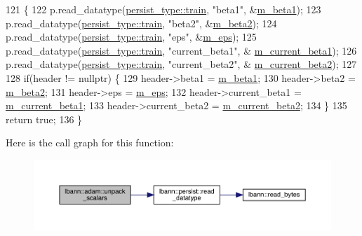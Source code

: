 \begin{DoxyCode}
121                                                                  \{
122     p.read\_datatype(\hyperlink{namespacelbann_adee41f31f15f3906cbdcce4a1417eb56a61b3a8faa9c1091806675c230a9abe64}{persist\_type::train}, \textcolor{stringliteral}{"beta1"}, &\hyperlink{classlbann_1_1adam_a73af15a28066edbfad9ba6a900746a19}{m\_beta1});
123     p.read\_datatype(\hyperlink{namespacelbann_adee41f31f15f3906cbdcce4a1417eb56a61b3a8faa9c1091806675c230a9abe64}{persist\_type::train}, \textcolor{stringliteral}{"beta2"}, &\hyperlink{classlbann_1_1adam_ab1f2a16b8eb7e265895ea9eef3fe87b2}{m\_beta2});
124     p.read\_datatype(\hyperlink{namespacelbann_adee41f31f15f3906cbdcce4a1417eb56a61b3a8faa9c1091806675c230a9abe64}{persist\_type::train}, \textcolor{stringliteral}{"eps"},   &\hyperlink{classlbann_1_1adam_a751102f0fd866612f5685050a08020a9}{m\_eps});
125     p.read\_datatype(\hyperlink{namespacelbann_adee41f31f15f3906cbdcce4a1417eb56a61b3a8faa9c1091806675c230a9abe64}{persist\_type::train}, \textcolor{stringliteral}{"current\_beta1"}, &
      \hyperlink{classlbann_1_1adam_a53c3034e187da2720447bbb4f2b59a5d}{m\_current\_beta1});
126     p.read\_datatype(\hyperlink{namespacelbann_adee41f31f15f3906cbdcce4a1417eb56a61b3a8faa9c1091806675c230a9abe64}{persist\_type::train}, \textcolor{stringliteral}{"current\_beta2"}, &
      \hyperlink{classlbann_1_1adam_ad38376b684d69d4a15da1d11f8808ca7}{m\_current\_beta2});
127 
128     \textcolor{keywordflow}{if}(header != \textcolor{keyword}{nullptr}) \{
129       header->beta1 = \hyperlink{classlbann_1_1adam_a73af15a28066edbfad9ba6a900746a19}{m\_beta1};
130       header->beta2 = \hyperlink{classlbann_1_1adam_ab1f2a16b8eb7e265895ea9eef3fe87b2}{m\_beta2};
131       header->eps = \hyperlink{classlbann_1_1adam_a751102f0fd866612f5685050a08020a9}{m\_eps};
132       header->current\_beta1 = \hyperlink{classlbann_1_1adam_a53c3034e187da2720447bbb4f2b59a5d}{m\_current\_beta1};
133       header->current\_beta2 = \hyperlink{classlbann_1_1adam_ad38376b684d69d4a15da1d11f8808ca7}{m\_current\_beta2};
134     \}
135     \textcolor{keywordflow}{return} \textcolor{keyword}{true};
136   \}
\end{DoxyCode}
Here is the call graph for this function\+:\nopagebreak
\begin{figure}[H]
\begin{center}
\leavevmode
\includegraphics[width=350pt]{classlbann_1_1adam_a21a3d2bce0bac5e6c022c5d95ec6348b_cgraph}
\end{center}
\end{figure}
